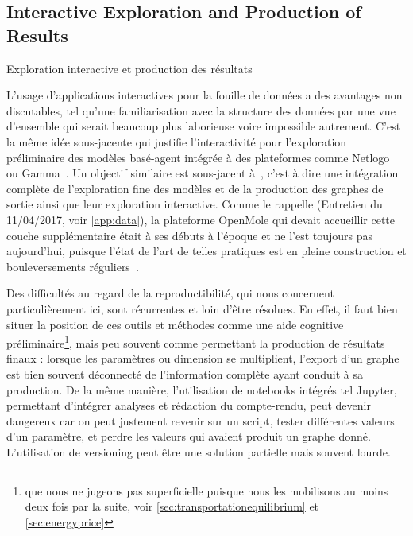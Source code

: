 \subsection{Interactive Exploration and Production of Results}{Exploration interactive et production des résultats}

L'usage d'applications interactives pour la fouille de données a des avantages non discutables, tel qu'une familiarisation avec la structure des données par une vue d'ensemble qui serait beaucoup plus laborieuse voire impossible autrement. C'est la même idée sous-jacente qui justifie l'interactivité pour l'exploration préliminaire des modèles basé-agent intégrée à des plateformes comme Netlogo~\cite{wilensky1999netlogo} ou Gamma~\cite{drogoul2013gama}. Un objectif similaire est sous-jacent à~\cite{rey2015plateforme}, c'est à dire une intégration complète de l'exploration fine des modèles et de la production des graphes de sortie ainsi que leur exploration interactive. Comme le rappelle  (Entretien du 11/04/2017, voir \ref{app:data}), la plateforme OpenMole qui devait accueillir cette couche supplémentaire était à ses débuts à l'époque et ne l'est toujours pas aujourd'hui, puisque l'état de l'art de telles pratiques est en pleine construction et bouleversements réguliers~\cite{holzinger2014knowledge}.


Des difficultés au regard de la reproductibilité, qui nous concernent particulièrement ici, sont récurrentes et loin d'être résolues. En effet, il faut bien situer la position de ces outils et méthodes comme une aide cognitive préliminaire\footnote{que nous ne jugeons pas superficielle puisque nous les mobilisons au moins deux fois par la suite, voir \ref{sec:transportationequilibrium} et \ref{sec:energyprice}}, mais peu souvent comme permettant la production de résultats finaux : lorsque les paramètres ou dimension se multiplient, l'export d'un graphe est bien souvent déconnecté de l'information complète ayant conduit à sa production. De la même manière, l'utilisation de notebooks intégrés tel Jupyter, permettant d'intégrer analyses et rédaction du compte-rendu, peut devenir dangereux car on peut justement revenir sur un script, tester différentes valeurs d'un paramètre, et perdre les valeurs qui avaient produit un graphe donné. L'utilisation de versioning peut être une solution partielle mais souvent lourde.


